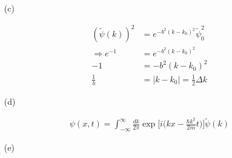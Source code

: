 \documentclass[11pt,a4paper]{article}
\begin{document}
\begin{enumerate}
\item[(c)]

\begin{align}
    (\tilde{\psi}(k))^2&=e^{-b^2(k-k_0)^2}\tilde{\psi}_0^2\\
    \Rightarrow e^{-1}&=e^{-b^2(k-k_0)^2}\\
    -1&=-b^2(k-k_0)^2\\
    \frac{1}{b}&=|k-k_0|=\frac{1}{2}\Delta k
\end{align}

\item[(d)]

\begin{align}
    \psi(x,t)=\int^\infty_{-\infty} \frac{dk}{2\pi}\exp{\bigg[i\bigg(kx-\frac{\hbar k^2}{2m}t\bigg)\bigg]}\tilde{\psi}(k)
\end{align}

\item[(e)]

\end{enumerate}
\end{document}
